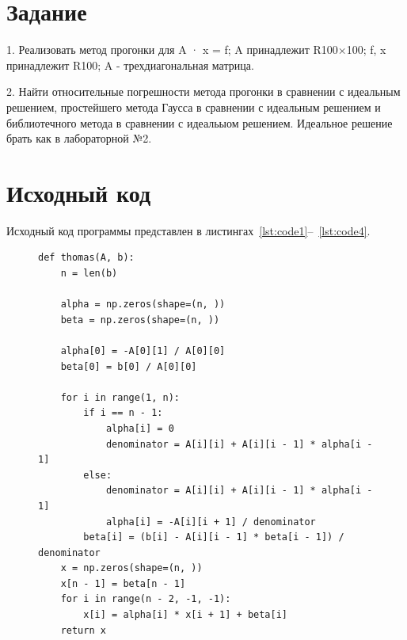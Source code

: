 \documentclass[a4paper, 14pt]{extarticle}
\begin{document}
\renewcommand{\ttdefault}{pcr}

\setlength{\tabcolsep}{3pt}
\newpage
\setcounter{page}{2}

\section{Задание}\label{Sect::task}
1. Реализовать метод прогонки для A · x = f; A принадлежит R100×100; f, x принадлежит R100; A -
трехдиагональная матрица.

2. Найти относительные погрешности метода прогонки в сравнении с идеальным решением, простейшего метода Гаусса в сравнении с идеальным
решением и библиотечного метода в сравнении с идеальыом решением.
Идеальное решение брать как в лабораторной №2.
\newpage
\section{Исходный код}

Исходный код программы представлен в листингах~\ref{lst:code1}--~\ref{lst:code4}.

\begin{figure}[H]
\begin{lstlisting}[language={},caption={Реализация метода прогонки},label={lst:code1}]
def thomas(A, b):
    n = len(b)

    alpha = np.zeros(shape=(n, ))
    beta = np.zeros(shape=(n, ))

    alpha[0] = -A[0][1] / A[0][0]
    beta[0] = b[0] / A[0][0]

    for i in range(1, n):
        if i == n - 1:
            alpha[i] = 0
            denominator = A[i][i] + A[i][i - 1] * alpha[i - 1]
        else:
            denominator = A[i][i] + A[i][i - 1] * alpha[i - 1]
            alpha[i] = -A[i][i + 1] / denominator
        beta[i] = (b[i] - A[i][i - 1] * beta[i - 1]) / denominator
    x = np.zeros(shape=(n, ))
    x[n - 1] = beta[n - 1]
    for i in range(n - 2, -1, -1):
        x[i] = alpha[i] * x[i + 1] + beta[i]
    return x
\end{lstlisting}
\end{figure}
\end{document}

